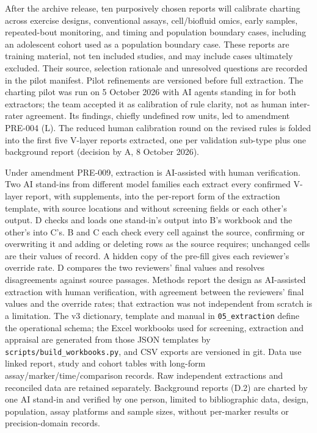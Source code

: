 \documentclass[
  11pt,
  a4paper,
]{article}
\begin{document}
After the archive release, ten purposively chosen reports will calibrate
charting across exercise designs, conventional assays, cell/biofluid
omics, early samples, repeated-bout monitoring, and timing and
population boundary cases, including an adolescent cohort used as a
population boundary case. These reports are training material, not ten
included studies, and may include cases ultimately excluded. Their
source, selection rationale and unresolved questions are recorded in the
pilot manifest. Pilot refinements are versioned before full extraction.
The charting pilot was run on 5 October 2026 with AI agents standing in
for both extractors; the team accepted it as calibration of rule
clarity, not as human inter-rater agreement. Its findings, chiefly
undefined row units, led to amendment PRE-004 (L). The reduced human
calibration round on the revised rules is folded into the first five
V-layer reports extracted, one per validation sub-type plus one
background report (decision by A, 8 October 2026).

Under amendment PRE-009, extraction is AI-assisted with human
verification. Two AI stand-ins from different model families each
extract every confirmed V-layer report, with supplements, into the
per-report form of the extraction template, with source locations and
without screening fields or each other's output. D checks and loads one
stand-in's output into B's workbook and the other's into C's. B and C
each check every cell against the source, confirming or overwriting it
and adding or deleting rows as the source requires; unchanged cells are
their values of record. A hidden copy of the pre-fill gives each
reviewer's override rate. D compares the two reviewers' final values and
resolves disagreements against source passages. Methods report the
design as AI-assisted extraction with human verification, with agreement
between the reviewers' final values and the override rates; that
extraction was not independent from scratch is a limitation. The v3
dictionary, template and manual in \texttt{05\_extraction} define the
operational schema; the Excel workbooks used for screening, extraction
and appraisal are generated from those JSON templates by
\texttt{scripts/build\_workbooks.py}, and CSV exports are versioned in
git. Data use linked report, study and cohort tables with long-form
assay/marker/time/comparison records. Raw independent extractions and
reconciled data are retained separately. Background reports (D.2) are
charted by one AI stand-in and verified by one person, limited to
bibliographic data, design, population, assay platforms and sample
sizes, without per-marker results or precision-domain records.
\end{document}
